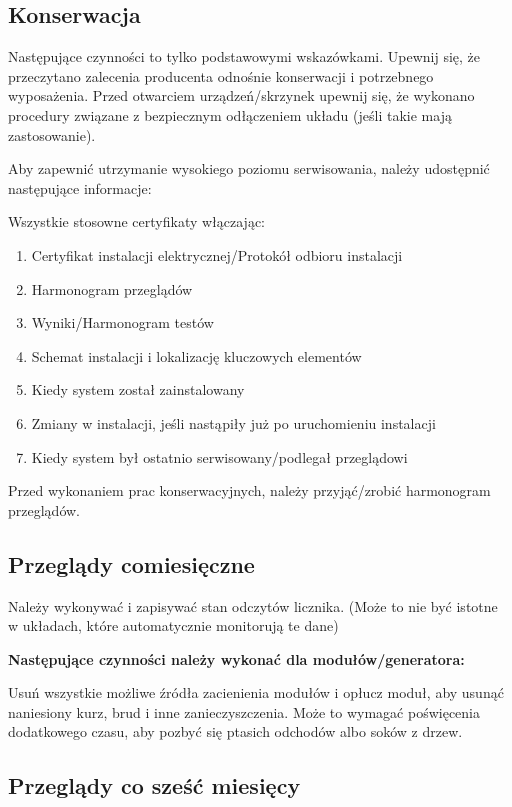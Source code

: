 \documentclass[12pt,a4paper]{article}
\begin{document}
 

\subsection{Konserwacja}


Następujące czynności to tylko podstawowymi wskazówkami. Upewnij się, że 
przeczytano zalecenia producenta odnośnie konserwacji i potrzebnego 
wyposażenia. Przed otwarciem urządzeń/skrzynek upewnij się, że wykonano 
procedury związane z bezpiecznym odłączeniem układu (jeśli takie mają 
zastosowanie). 

Aby zapewnić utrzymanie wysokiego poziomu serwisowania, należy 
udostępnić następujące informacje: 


Wszystkie stosowne certyfikaty włączając: 

\begin{enumerate}
\item Certyfikat instalacji elektrycznej/Protokół odbioru instalacji
\item Harmonogram przeglądów 
\item Wyniki/Harmonogram testów 
\item Schemat instalacji i lokalizację kluczowych elementów 
\item Kiedy system został zainstalowany 
\item Zmiany w instalacji, jeśli nastąpiły już po uruchomieniu 
instalacji 
\item Kiedy system był ostatnio serwisowany/podlegał przeglądowi 
\end{enumerate}
 

Przed wykonaniem prac konserwacyjnych, należy przyjąć/zrobić harmonogram 
przeglądów. 

\subsection{Przeglądy comiesięczne}

Należy wykonywać i zapisywać stan odczytów licznika. (Może to nie być 
istotne w układach, które automatycznie monitorują te dane) 

\textbf{Następujące czynności należy wykonać dla modułów/generatora: }

Usuń wszystkie możliwe źródła zacienienia modułów i opłucz moduł, aby 
usunąć naniesiony kurz, brud i inne zanieczyszczenia. Może to wymagać 
poświęcenia dodatkowego czasu, aby pozbyć się ptasich odchodów albo 
soków z drzew. 

\subsection{Przeglądy co sześć miesięcy}
\end{document}

